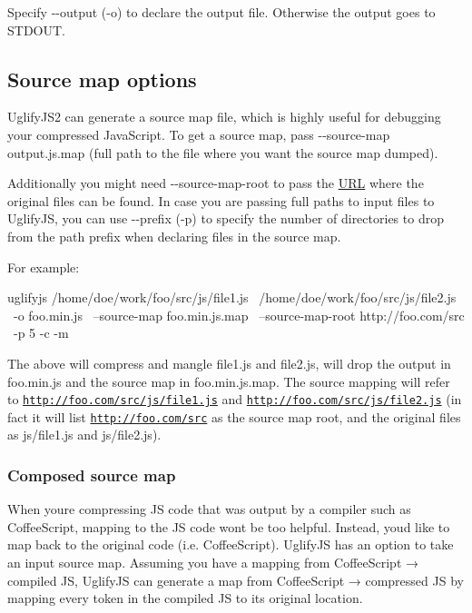 Specify {\ttfamily -\/-\/output} ({\ttfamily -\/o}) to declare the output file. Otherwise the output goes to S\+T\+D\+O\+UT.

\subsection*{Source map options}

Uglify\+J\+S2 can generate a source map file, which is highly useful for debugging your compressed Java\+Script. To get a source map, pass {\ttfamily -\/-\/source-\/map output.\+js.\+map} (full path to the file where you want the source map dumped).

Additionally you might need {\ttfamily -\/-\/source-\/map-\/root} to pass the \mbox{\hyperlink{namespace_u_r_l}{U\+RL}} where the original files can be found. In case you are passing full paths to input files to Uglify\+JS, you can use {\ttfamily -\/-\/prefix} ({\ttfamily -\/p}) to specify the number of directories to drop from the path prefix when declaring files in the source map.

For example\+: \begin{DoxyVerb}uglifyjs /home/doe/work/foo/src/js/file1.js \
         /home/doe/work/foo/src/js/file2.js \
         -o foo.min.js \
         --source-map foo.min.js.map \
         --source-map-root http://foo.com/src \
         -p 5 -c -m
\end{DoxyVerb}


The above will compress and mangle {\ttfamily file1.\+js} and {\ttfamily file2.\+js}, will drop the output in {\ttfamily foo.\+min.\+js} and the source map in {\ttfamily foo.\+min.\+js.\+map}. The source mapping will refer to {\ttfamily \href{http://foo.com/src/js/file1.js}{\tt http\+://foo.\+com/src/js/file1.\+js}} and {\ttfamily \href{http://foo.com/src/js/file2.js}{\tt http\+://foo.\+com/src/js/file2.\+js}} (in fact it will list {\ttfamily \href{http://foo.com/src}{\tt http\+://foo.\+com/src}} as the source map root, and the original files as {\ttfamily js/file1.\+js} and {\ttfamily js/file2.\+js}).

\subsubsection*{Composed source map}

When you\textquotesingle{}re compressing JS code that was output by a compiler such as Coffee\+Script, mapping to the JS code won\textquotesingle{}t be too helpful. Instead, you\textquotesingle{}d like to map back to the original code (i.\+e. Coffee\+Script). Uglify\+JS has an option to take an input source map. Assuming you have a mapping from Coffee\+Script → compiled JS, Uglify\+JS can generate a map from Coffee\+Script → compressed JS by mapping every token in the compiled JS to its original location.

